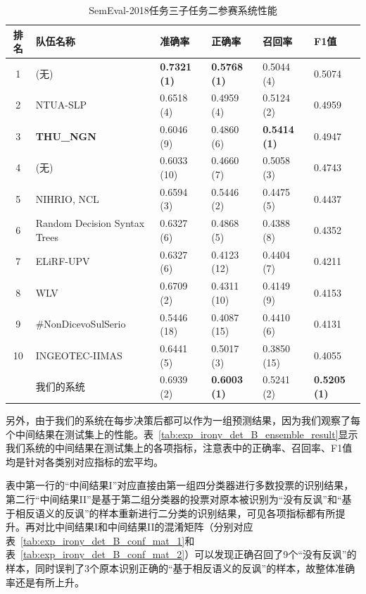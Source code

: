 \begin{table}[htb]
  \centering
  \begin{minipage}[t]{\linewidth}
  \caption{SemEval-2018任务三子任务二参赛系统性能} %
  \label{tab:exp_irony_det_B_other_comp}
    \begin{tabularx}{\linewidth}{c|X|llll}
    \toprule[1.5pt]
    排名 & 队伍名称 & 准确率 & 正确率 & 召回率 & F1值 \\
    \hline 
    1 & (无) & \bf 0.7321 (1) & \bf 0.5768 (1) & 0.5044 (4) & 0.5074 \\
    2 & NTUA-SLP & 0.6518 (4) & 0.4959 (4) & 0.5124 (2) & 0.4959 \\
    3 & \bf THU\_NGN & 0.6046 (9) & 0.4860 (6) & \bf 0.5414 (1) & 0.4947 \\
    4 & (无) & 0.6033 (10) & 0.4660 (7) & 0.5058 (3) & 0.4743 \\
    5 & NIHRIO, NCL & 0.6594 (3) & 0.5446 (2) & 0.4475 (5) & 0.4437 \\
    6 & Random Decision Syntax Trees & 0.6327 (6) & 0.4868 (5) & 0.4388 (8) & 0.4352 \\
    7 & ELiRF-UPV & 0.6327 (6) & 0.4123 (12) & 0.4404 (7) & 0.4211 \\
    8 & WLV & 0.6709 (2) & 0.4311 (10) & 0.4149 (9) & 0.4153 \\
    9 & \#NonDicevoSulSerio & 0.5446 (18) & 0.4087 (15) & 0.4410 (6) & 0.4131 \\
    10 & INGEOTEC-IIMAS & 0.6441 (5) & 0.5017 (3) & 0.3850 (15) & 0.4055 \\
    \hline
    & 我们的系统 & 0.6939 (2) & \bf 0.6003 (1) & 0.5241 (2) & \bf 0.5205 (1) \\
    \bottomrule[1.5pt]
    \end{tabularx}
  \end{minipage}
\end{table}

另外，由于我们的系统在每步决策后都可以作为一组预测结果，因为我们观察了每个中间结果在测试集上的性能。表~\ref{tab:exp_irony_det_B_ensemble_result}显示我们系统的中间结果在测试集上的各项指标，注意表中的正确率、召回率、F1值均是针对各类别对应指标的宏平均。

表中第一行的“中间结果I”对应直接由第一组四分类器进行多数投票的识别结果，第二行“中间结果II”是基于第二组分类器的投票对原本被识别为“没有反讽”和“基于相反语义的反讽”的样本重新进行二分类的识别结果，可见各项指标都有所提升。再对比中间结果I和中间结果II的混淆矩阵（分别对应表~\ref{tab:exp_irony_det_B_conf_mat_1}和表~\ref{tab:exp_irony_det_B_conf_mat_2}）可以发现正确召回了9个“没有反讽”的样本，同时误判了3个原本识别正确的“基于相反语义的反讽”的样本，故整体准确率还是有所上升。

